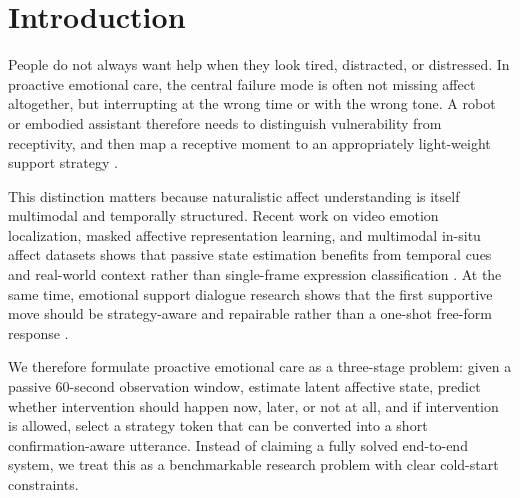 \section{Introduction}
People do not always want help when they look tired, distracted, or distressed. In proactive emotional care, the central failure mode is often not missing affect altogether, but interrupting at the wrong time or with the wrong tone. A robot or embodied assistant therefore needs to distinguish vulnerability from receptivity, and then map a receptive moment to an appropriately light-weight support strategy \cite{mrt2022,mrt2023,jmir2021}.

This distinction matters because naturalistic affect understanding is itself multimodal and temporally structured. Recent work on video emotion localization, masked affective representation learning, and multimodal in-situ affect datasets shows that passive state estimation benefits from temporal cues and real-world context rather than single-frame expression classification \cite{wsvd2023,mart2024,kemocon2020,kemophone2023,stressid2023}. At the same time, emotional support dialogue research shows that the first supportive move should be strategy-aware and repairable rather than a one-shot free-form response \cite{esc2021,lookahead2022,pal2023,traitsempathy2025}.

We therefore formulate proactive emotional care as a three-stage problem: given a passive 60-second observation window, estimate latent affective state, predict whether intervention should happen now, later, or not at all, and if intervention is allowed, select a strategy token that can be converted into a short confirmation-aware utterance. Instead of claiming a fully solved end-to-end system, we treat this as a benchmarkable research problem with clear cold-start constraints.


